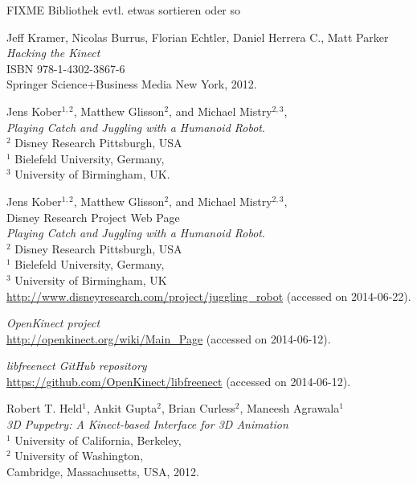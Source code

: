\documentclass[12pt,a4paper,ngerman]{scrartcl}
\begin{document}
\newpage
{}
{}
\renewcommand{\refname}{Quellen}

\begin{thebibliography}{99}

{\color{red}
FIXME Bibliothek evtl. etwas sortieren oder so}

Jeff Kramer, Nicolas Burrus, Florian Echtler, Daniel Herrera C., Matt Parker\\
{\em Hacking the Kinect}\\
ISBN 978-1-4302-3867-6\\
Springer Science+Business Media New York, 2012.

Jens Kober$^{1,2}$, Matthew Glisson$^{2}$, and Michael Mistry$^{2,3}$,\\
{\em Playing Catch and Juggling with a Humanoid Robot}.\\
$^{2}$ Disney Research Pittsburgh, USA\\
$^{1}$ Bielefeld University, Germany,\\
$^{3}$ University of Birmingham, UK.

Jens Kober$^{1,2}$, Matthew Glisson$^{2}$, and Michael Mistry$^{2,3}$,\\
Disney Research Project Web Page\\
{\em Playing Catch and Juggling with a Humanoid Robot}.\\
$^{2}$ Disney Research Pittsburgh, USA\\
$^{1}$ Bielefeld University, Germany,\\
$^{3}$ University of Birmingham, UK\\
\url{http://www.disneyresearch.com/project/juggling_robot} (accessed on 2014-06-22).

{\em OpenKinect project}\\
\url{http://openkinect.org/wiki/Main_Page} (accessed on 2014-06-12).

{\em libfreenect GitHub repository}\\
\url{https://github.com/OpenKinect/libfreenect} (accessed on 2014-06-12).

Robert T. Held$^{1}$, Ankit Gupta$^{2}$, Brian Curless$^{2}$, Maneesh Agrawala$^{1}$\\
{\em 3D Puppetry: A Kinect-based Interface for 3D Animation}\\
$^{1}$ University of California, Berkeley,\\
$^{2}$ University of Washington,\\
Cambridge, Massachusetts, USA, 2012.


\end{thebibliography}
\end{document}
